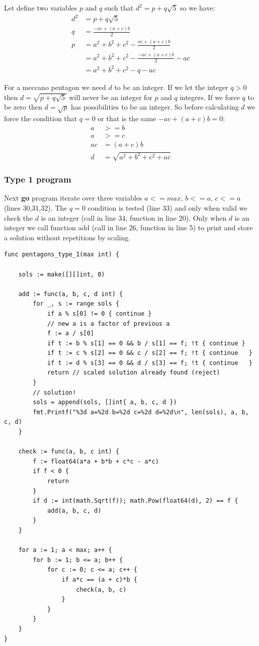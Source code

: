 \documentclass[11pt]{article}
\begin{document}
Let define two variables $p$ and $q$ such that $d^2 = p + q\sqrt{5}$ so we have:
\begin{align*}
d^2 &= p + q\sqrt{5}\\
  q &= \frac{-ac + (a + c)b}{2}\\
  p &= a^2 + b^2 + c^2 - \frac{ac + (a+c)b}{2}\\
    &= a^2 + b^2 + c^2 - \frac{-ac + (a+c)b}{2} - ac\\
    &= a^2 + b^2 + c^2 - q - ac
\end{align*}

For a meccano pentagon we need $d$ to be an integer. If we let the integer $q > 0$ then $d = \sqrt{p + q\sqrt{5}}$ will never be an integer for $p$ and $q$ integers. If we force $q$ to be zero then $d = \sqrt{p}$ has possibilities to be an integer.
So before calculating $d$ we force the condition that $q = 0$ or that is the same $-ac + (a+c)b = 0$:
\begin{align*}
a  & >= b\\
a  & >= c\\
ac &= (a + c)b\\
 d &= \sqrt{a^2 + b^2 + c^2 + ac}
\end{align*}

\subsubsection{Type 1 program}

Next \textbf{go} program iterate over three variables $a <= max$, $b <= a$, $c <= a$ (lines 30,31,32).
The $q = 0$ condition is tested (line 33) and only when valid we check the $d$ is an integer (call in line 34, function in line 20). Only when $d$ is an integer we call function
add (call in line 26, function in line 5) to print and store a solution without repetitions by scaling.
\begin{lstlisting}
func pentagons_type_1(max int) {

	sols := make([][]int, 0)

	add := func(a, b, c, d int) {
		for _, s := range sols {
			if a % s[0] != 0 { continue }
			// new a is a factor of previous a
			f := a / s[0]
			if t := b % s[1] == 0 && b / s[1] == f; !t { continue }
			if t := c % s[2] == 0 && c / s[2] == f; !t { continue	}
			if t := d % s[3] == 0 && d / s[3] == f; !t { continue	}
			return // scaled solution already found (reject)
		}
		// solution!
		sols = append(sols, []int{ a, b, c, d })
		fmt.Printf("%3d a=%2d b=%2d c=%2d d=%2d\n", len(sols), a, b, c, d)
	}

	check := func(a, b, c int) {
		f := float64(a*a + b*b + c*c - a*c)
		if f < 0 {
			return
		}
		if d := int(math.Sqrt(f)); math.Pow(float64(d), 2) == f {
			add(a, b, c, d)
		}
	}

	for a := 1; a < max; a++ {
		for b := 1; b <= a; b++ {
			for c := 0; c <= a; c++ {
				if a*c == (a + c)*b {
					check(a, b, c)
				}
			}
		}
	}
}
\end{lstlisting}
\end{document}
